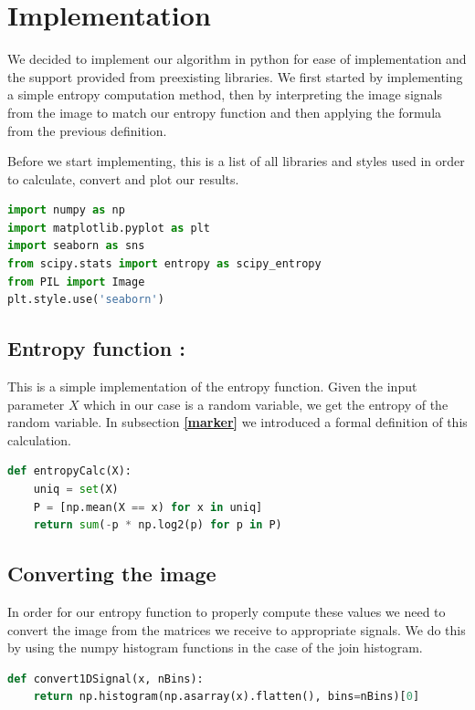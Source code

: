 \documentclass{article}
\begin{document}
\section{Implementation}
\vspace{2mm}
\begin{flushleft}
We decided to implement our algorithm in python for ease of implementation and the support provided from preexisting libraries. We first started by implementing a simple entropy computation method, then by interpreting the image signals from the image to match our entropy function and then applying the formula from the previous definition.

Before we start implementing, this is a list of all libraries and styles used in order to calculate, convert and plot our results.
\end{flushleft}
\begin{lstlisting}[language=Python]
import numpy as np
import matplotlib.pyplot as plt
import seaborn as sns
from scipy.stats import entropy as scipy_entropy
from PIL import Image
plt.style.use('seaborn')
\end{lstlisting}

\subsection{Entropy function :}
\vspace{2mm}
\begin{flushleft}
This is a simple implementation of the entropy function. Given the input parameter $X$ which in our case is a random variable, we get the entropy of the random variable. In subsection \textbf{\ref{marker}} we introduced a formal definition of this calculation.
\end{flushleft}
\begin{lstlisting}[language=Python, caption=Entropy Calculator]
def entropyCalc(X):
    uniq = set(X)
    P = [np.mean(X == x) for x in uniq]
    return sum(-p * np.log2(p) for p in P)

\end{lstlisting}

\subsection{Converting the image}
\vspace{2mm}
\begin{flushleft}
In order for our entropy function to properly compute these values we need to convert the image from the matrices we receive to appropriate signals. We do this by using the numpy histogram functions in the case of the join histogram.
\end{flushleft}
\begin{lstlisting}[language=Python, caption=1D Signal]
def convert1DSignal(x, nBins):
    return np.histogram(np.asarray(x).flatten(), bins=nBins)[0]
\end{lstlisting}
\end{document}
